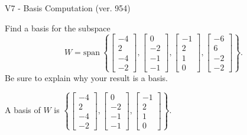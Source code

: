 \begin{exercise}
  \begin{exerciseTitle}V7 - Basis Computation (ver. 954)\end{exerciseTitle}
  \begin{exerciseStatement}
    Find a basis for the subspace 
\[W=\mathrm{span}\ \left\{\left[\begin{array}{r}
-4 \\
2 \\
-4 \\
-2
\end{array}\right] , \left[\begin{array}{r}
0 \\
-2 \\
-1 \\
-1
\end{array}\right] , \left[\begin{array}{r}
-1 \\
2 \\
1 \\
0
\end{array}\right] , \left[\begin{array}{r}
-6 \\
6 \\
-2 \\
-2
\end{array}\right]\right\}.\]
 Be sure to explain why your result is a basis.


  \end{exerciseStatement}
  \begin{exerciseAnswer}
   A basis of \(W\) is  \(\left\{\left[\begin{array}{r}
-4 \\
2 \\
-4 \\
-2
\end{array}\right] , \left[\begin{array}{r}
0 \\
-2 \\
-1 \\
-1
\end{array}\right] , \left[\begin{array}{r}
-1 \\
2 \\
1 \\
0
\end{array}\right]\right\}\).
  


  \end{exerciseAnswer}
\end{exercise}
